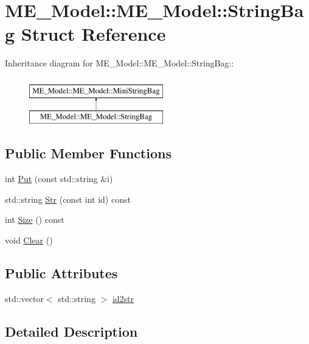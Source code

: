\hypertarget{structME__Model_1_1StringBag}{
\section{ME\_\-Model::ME\_\-Model::StringBag Struct Reference}
\label{structME__Model_1_1StringBag}
}
Inheritance diagram for ME\_\-Model::ME\_\-Model::StringBag::\begin{figure}[H]
\begin{center}
\leavevmode
\includegraphics[height=2cm]{structME__Model_1_1StringBag}
\end{center}
\end{figure}
\subsection*{Public Member Functions}
\begin{CompactItemize}
\item 
int \hyperlink{structME__Model_1_1StringBag_d31d8c058e0795df0d25ee806088db1a}{Put} (const std::string \&i)
\item 
std::string \hyperlink{structME__Model_1_1StringBag_fd579fe2b81e3cdd3a30761b1486ce41}{Str} (const int id) const 
\item 
int \hyperlink{structME__Model_1_1StringBag_f1fc09c60ddd0274cc3f4b81377f626f}{Size} () const 
\item 
void \hyperlink{structME__Model_1_1StringBag_ce3d97f271ebaa31f4f09399b2c618db}{Clear} ()
\end{CompactItemize}
\subsection*{Public Attributes}
\begin{CompactItemize}
\item 
std::vector$<$ std::string $>$ \hyperlink{structME__Model_1_1StringBag_c0c4fde0a9e8a41153b18a96df8809a2}{id2str}
\end{CompactItemize}


\subsection{Detailed Description}


